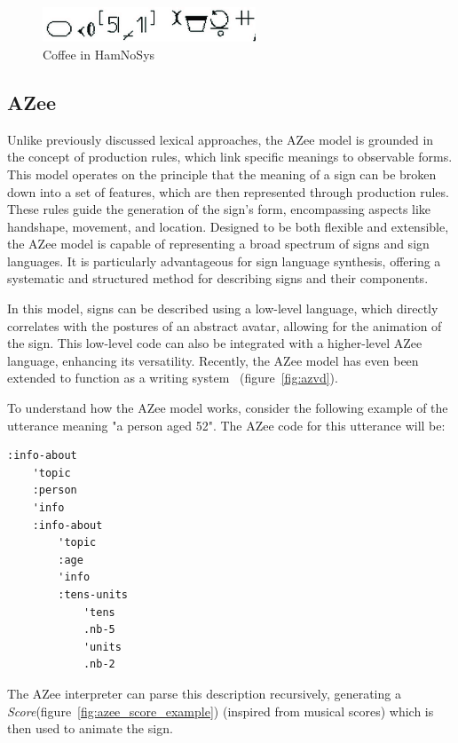 \documentclass[../../main.tex]{subfiles}
\begin{document}
\begin{figure}
  \centering \includegraphics[width = 2.5in]{chapters/background_work/images/hamnosys_coffee.png}
  \caption{Coffee in HamNoSys}
  \label{fig:hamnosys_coffee}
\end{figure}

\subsection{AZee}
\label{ch:background_work:sign_language_descriptions:azee}

Unlike previously discussed lexical approaches, the AZee model is grounded in the concept of production rules, which link specific meanings to observable forms. This model operates on the principle that the meaning of a sign can be broken down into a set of features, which are then represented through production rules. These rules guide the generation of the sign's form, encompassing aspects like handshape, movement, and location. Designed to be both flexible and extensible, the AZee model is capable of representing a broad spectrum of signs and sign languages. It is particularly advantageous for sign language synthesis, offering a systematic and structured method for describing signs and their components.

In this model, signs can be described using a low-level language, which directly correlates with the postures of an abstract avatar, allowing for the animation of the sign. This low-level code can also be integrated with a higher-level AZee language, enhancing its versatility. Recently, the AZee model has even been extended to function as a writing system~\cite{filhol2024software} (figure~\ref{fig:azvd}).

To understand how the AZee model works, consider the following example of the utterance meaning "a person aged 52". The AZee code for this utterance will be:

\begin{verbatim}
:info-about
	'topic
	:person
	'info
	:info-about
		'topic
		:age
		'info
		:tens-units
			'tens
			.nb-5
			'units
			.nb-2
\end{verbatim}

The AZee interpreter can parse this description recursively, generating a \emph{Score}(figure~\ref{fig:azee_score_example}) (inspired from musical scores) which is then used to animate the sign.
\end{document}
